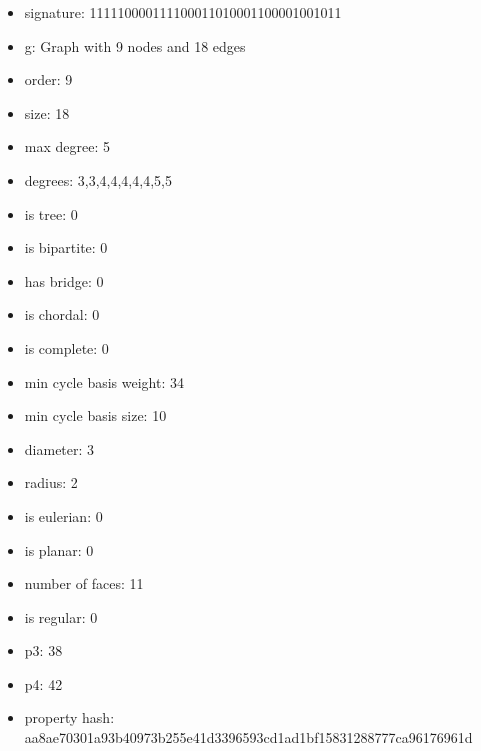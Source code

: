 \newpage
\begin{figure}
\end{figure}
\begin{itemize}
\item signature: 111110000111100011010001100001001011
\item g: Graph with 9 nodes and 18 edges
\item order: 9
\item size: 18
\item max degree: 5
\item degrees: 3,3,4,4,4,4,4,5,5
\item is tree: 0
\item is bipartite: 0
\item has bridge: 0
\item is chordal: 0
\item is complete: 0
\item min cycle basis weight: 34
\item min cycle basis size: 10
\item diameter: 3
\item radius: 2
\item is eulerian: 0
\item is planar: 0
\item number of faces: 11
\item is regular: 0
\item p3: 38
\item p4: 42
\item property hash: aa8ae70301a93b40973b255e41d3396593cd1ad1bf15831288777ca96176961d
\end{itemize}
